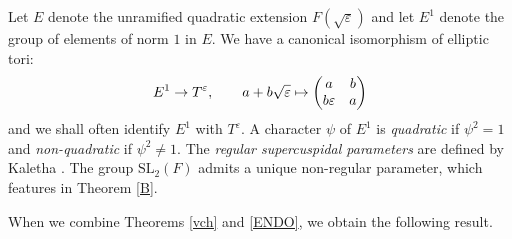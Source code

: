 \documentclass[11pt]{amsart}
\numberwithin{equation}{section}
\def\fe{\mathfrak{e}}
\def\SL{\mathrm{SL}}
\newcommand{\<}{\left\langle}
\renewcommand{\>}{\right\rangle}
\begin{document}
Let $E$ denote the unramified quadratic extension $F(\sqrt \varepsilon)$ and let $E^1$ denote the group of elements of norm $1$ in $E$.   We have a canonical isomorphism of elliptic tori:
\begin{eqnarray}
E^1 \to T^\varepsilon, \quad \quad a + b\sqrt \varepsilon \mapsto \left(
\begin{matrix}
a&b\cr
b\varepsilon&a
\end{matrix}\right)
\end{eqnarray}
and we shall often identify $E^1$ with $T^\varepsilon$.     A character $\psi$ of $E^1$ is \emph{quadratic} if $\psi^2 = 1$ and 
\emph{non-quadratic} if $\psi^2 \neq 1$.   The \emph{regular supercuspidal parameters} are defined by Kaletha \cite[Def. 5.2.3]{Ka2}.   
The group $\SL_2(F)$ admits a unique non-regular parameter, which features in Theorem \ref{B}.    


When we combine Theorems \ref{vch}  and  \ref{ENDO}, we obtain the following result.

\end{document}
